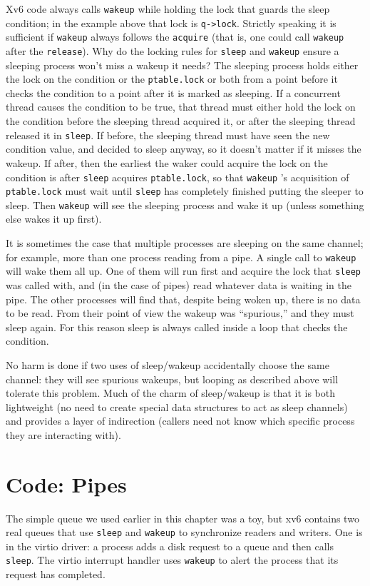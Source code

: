Xv6 code always calls
\lstinline{wakeup}
while holding the lock that guards the sleep condition;
in the example above that lock is
\lstinline{q->lock}.
Strictly speaking it is sufficient if
\lstinline{wakeup}
always follows the
\lstinline{acquire}
(that is, one could call
\lstinline{wakeup}
after the
\lstinline{release}).
Why do the locking rules for 
\lstinline{sleep}
and
\lstinline{wakeup}
ensure a sleeping process won't miss a wakeup it needs?
The sleeping process holds either
the lock on the condition or the
\lstinline{ptable.lock} 
or both from a point before it checks the condition
to a point after it is marked as sleeping.
If a concurrent thread causes the condition to be true,
that thread must either hold the lock on the condition before the
sleeping thread acquired it, or after the sleeping
thread released it in
\lstinline{sleep}.
If before, the sleeping thread must have seen the new condition
value, and decided to sleep anyway, so it doesn't matter
if it misses the wakeup.
If after, then the earliest the waker could acquire the
lock on the condition is after
\lstinline{sleep}
acquires
\lstinline{ptable.lock},
so that
\lstinline{wakeup} 's
acquisition of
\lstinline{ptable.lock}
must wait until
\lstinline{sleep}
has completely finished putting the sleeper to sleep.
Then 
\lstinline{wakeup}
will see the sleeping process and wake it up
(unless something else wakes it up first).

It is sometimes the case that multiple processes are sleeping
on the same channel; for example, more than one process
reading from a pipe.
A single call to 
\lstinline{wakeup}
will wake them all up.
One of them will run first and acquire the lock that
\lstinline{sleep}
was called with, and (in the case of pipes) read whatever
data is waiting in the pipe.
The other processes will find that, despite being woken up,
there is no data to be read.
From their point of view the wakeup was ``spurious,'' and
they must sleep again.
For this reason sleep is always called inside a loop that
checks the condition.

No harm is done if two uses of sleep/wakeup accidentally
choose the same channel: they will see spurious wakeups,
but looping as described above will tolerate this problem.
Much of the charm of sleep/wakeup is that it is both
lightweight (no need to create special data
structures to act as sleep channels) and provides a layer
of indirection (callers need not know which specific process
they are interacting with).
\section{Code: Pipes}
The simple queue we used earlier in this chapter
was a toy, but xv6 contains two real queues
that use
\lstinline{sleep}
and
\lstinline{wakeup}
to synchronize readers and writers.
One is in the virtio driver: a process adds a disk request to a queue and then
calls
\lstinline{sleep}.
The virtio interrupt handler uses
\lstinline{wakeup}
to alert the process that its request has completed.

